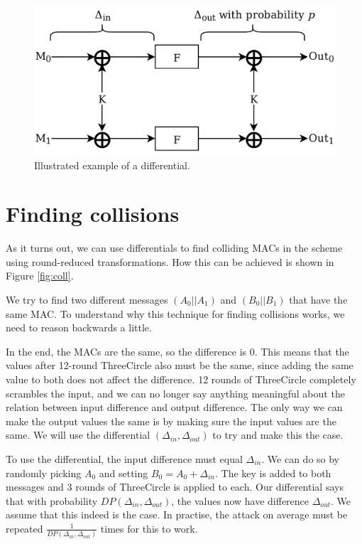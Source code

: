 \documentclass{report}
\newcommand{\ThreeCircle}{{\sc ThreeCircle} }
\begin{document}
\begin{figure}[!ht]
\centering
\includegraphics[scale=0.125]{imgs/Differential_Example.png}
\caption{Illustrated example of a differential.}
\label{fig:diff}
\end{figure}

\section{Finding collisions}
As it turns out, we can use differentials to find colliding MACs in the scheme using round-reduced transformations. How this can be achieved is shown in Figure \ref{fig:coll}.

We try to find two different messages $(A_0 || A_1)$ and $(B_0 || B_1)$ that have the same MAC. To understand why this technique for finding collisions works, we need to reason backwards a little.

In the end, the MACs are the same, so the difference is 0. This means that the values after 12-round \ThreeCircle also must be the same, since adding the same value to both does not affect the difference. 12 rounds of \ThreeCircle completely scrambles the input, and we can no longer say anything meaningful about the relation between input difference and output difference. The only way we can make the output values the same is by making sure the input values are the same. We will use the differential $(\Delta_{in}, \Delta_{out})$ to try and make this the case.

To use the differential, the input difference must equal $\Delta_{in}$. We can do so by randomly picking $A_0$ and setting $B_0 = A_0 + \Delta_{in}$. The key is added to both messages and 3 rounds of \ThreeCircle is applied to each. Our differential says that with probability $DP(\Delta_{in}, \Delta_{out})$, the values now have difference $\Delta_{out}$. We assume that this indeed is the case. In practise, the attack on average must be repeated $\frac{1}{DP(\Delta_{in}, \Delta_{out})}$ times for this to work.
\end{document}
